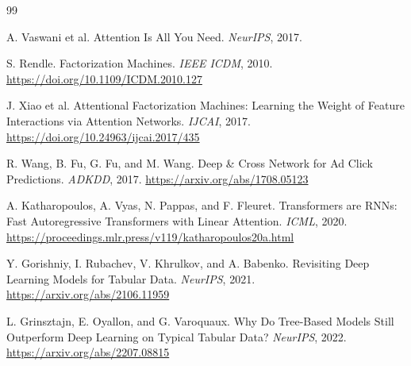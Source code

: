 \documentclass[11pt,a4paper]{article}
\begin{document}
\begin{thebibliography}{99}

A. Vaswani et al.
\newblock Attention Is All You Need.
\newblock \emph{NeurIPS}, 2017.

S. Rendle.
\newblock Factorization Machines.
\newblock \emph{IEEE ICDM}, 2010.
\newblock
\url{https://doi.org/10.1109/ICDM.2010.127}

J. Xiao et al.
\newblock Attentional Factorization Machines:
Learning the Weight of Feature Interactions
via Attention Networks.
\newblock \emph{IJCAI}, 2017.
\newblock
\url{https://doi.org/10.24963/ijcai.2017/435}

R. Wang, B. Fu, G. Fu, and M. Wang.
\newblock Deep \& Cross Network for
Ad Click Predictions.
\newblock \emph{ADKDD}, 2017.
\newblock
\url{https://arxiv.org/abs/1708.05123}

A. Katharopoulos, A. Vyas,
N. Pappas, and F. Fleuret.
\newblock Transformers are RNNs:
Fast Autoregressive Transformers
with Linear Attention.
\newblock \emph{ICML}, 2020.
\newblock
\url{https://proceedings.mlr.press/v119/katharopoulos20a.html}

Y. Gorishniy, I. Rubachev,
V. Khrulkov, and A. Babenko.
\newblock Revisiting Deep Learning
Models for Tabular Data.
\newblock \emph{NeurIPS}, 2021.
\newblock
\url{https://arxiv.org/abs/2106.11959}

L. Grinsztajn, E. Oyallon,
and G. Varoquaux.
\newblock Why Do Tree-Based Models
Still Outperform Deep Learning
on Typical Tabular Data?
\newblock \emph{NeurIPS}, 2022.
\newblock
\url{https://arxiv.org/abs/2207.08815}

\end{thebibliography}
\end{document}
